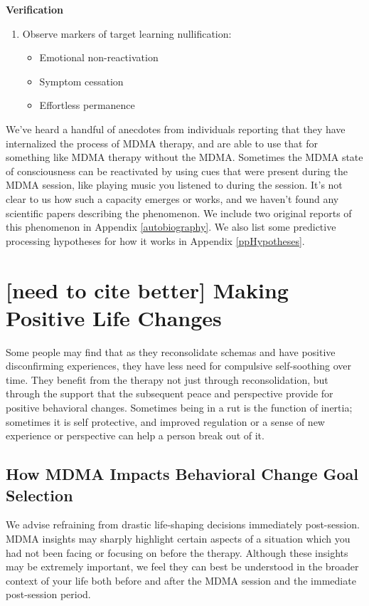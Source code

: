 \documentclass[12pt,letterpaper]{book}
\begin{document}
\noindent\textbf{Verification}
\begin{enumerate}
    \renewcommand{\labelenumi}{V.}
    \item Observe markers of target learning nullification:
    \begin{itemize}
        \item Emotional non-reactivation
        \item Symptom cessation
        \item Effortless permanence
    \end{itemize}
\end{enumerate}

We've heard a handful of anecdotes from individuals reporting that they have internalized the process of MDMA therapy, and are able to use that for something like MDMA therapy without the MDMA. Sometimes the MDMA state of consciousness can be reactivated by using cues that were present during the MDMA session, like playing music you listened to during the session. It's not clear to us how such a capacity emerges or works, and we haven't found any scientific papers describing the phenomenon. We include two original reports of this phenomenon in Appendix \ref{autobiography}. We also list some predictive processing hypotheses for how it works in Appendix \ref{ppHypotheses}.
\section{[need to cite better] Making Positive Life Changes}
\label{sec:behavioralchange}
Some people may find that as they reconsolidate schemas and have positive disconfirming experiences, they have less need for compulsive self-soothing over time. They benefit from the therapy not just through reconsolidation, but through the support that the subsequent peace and perspective provide for positive behavioral changes. Sometimes being in a rut is the function of inertia; sometimes it is self protective, and improved regulation or a sense of new experience or perspective can help a person break out of it.

\subsection*{How MDMA Impacts Behavioral Change Goal Selection}

We advise refraining from drastic life-shaping decisions immediately post-session. MDMA insights may sharply highlight certain aspects of a situation which you had not been facing or focusing on before the therapy. Although these insights may be extremely important, we feel they can best be understood in the broader context of your life both before and after the MDMA session and the immediate post-session period.
\end{document}
